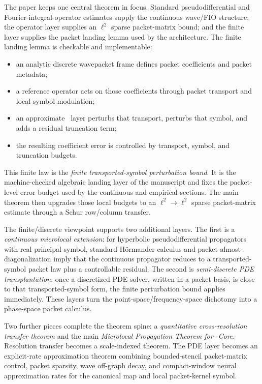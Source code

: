 The paper keeps one central theorem in focus.  Standard pseudodifferential and Fourier-integral-operator estimates supply the continuous wave/FIO structure; the operator layer supplies an $\ell^2$ sparse packet-matrix bound; and the finite layer supplies the packet landing lemma used by the architecture.  The finite landing lemma is checkable and implementable:
\begin{itemize}
\item an analytic discrete wavepacket frame defines packet coefficients and packet metadata;
\item a reference operator acts on those coefficients through packet transport and local symbol modulation;
\item an approximate \MiNO\ layer perturbs that transport, perturbs that symbol, and adds a residual truncation term;
\item the resulting coefficient error is controlled by transport, symbol, and truncation budgets.
\end{itemize}
This finite law is the \emph{finite transported-symbol perturbation bound}.  It is the machine-checked algebraic landing layer of the manuscript and fixes the packet-level error budget used by the continuous and empirical sections.  The main theorem then upgrades those local budgets to an $\ell^2\to\ell^2$ sparse packet-matrix estimate through a Schur row/column transfer.

The finite/discrete viewpoint supports two additional layers. The first is a \emph{continuous microlocal extension}: for hyperbolic pseudodifferential propagators with real principal symbol, standard H\"ormander calculus and packet almost-diagonalization imply that the continuous propagator reduces to a transported-symbol packet law plus a controllable residual. The second is \emph{semi-discrete PDE transplantation}: once a discretized PDE solver, written in a packet basis, is close to that transported-symbol form, the finite perturbation bound applies immediately. These layers turn the point-space/frequency-space dichotomy into a phase-space packet calculus.

Two further pieces complete the theorem spine: a \emph{quantitative cross-resolution transfer theorem} and the main \emph{Microlocal Propagation Theorem for \MiNO-Core}. Resolution transfer becomes a scale-indexed theorem. The PDE layer becomes an explicit-rate approximation theorem combining bounded-stencil packet-matrix control, packet sparsity, wave off-graph decay, and compact-window neural approximation rates for the canonical map and local packet-kernel symbol.

